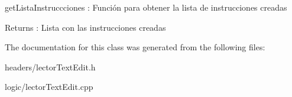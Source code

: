 get\+Lista\+Instruccciones \+: Función para obtener la lista de instrucciones creadas 

\begin{DoxyReturn}{Returns}
\+: Lista con las instrucciones creadas 
\end{DoxyReturn}


The documentation for this class was generated from the following files\+:\begin{DoxyCompactItemize}
\item 
headers/lector\+Text\+Edit.\+h\item 
logic/lector\+Text\+Edit.\+cpp\end{DoxyCompactItemize}
